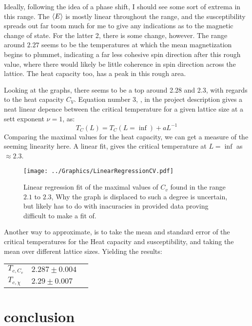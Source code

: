 \documentclass[10pt, twocolumn]{revtex4-1}
\begin{document}
Ideally, following the idea of a phase shift, I should see some sort of extrema in this range. The $\ev{E}$ is mostly linear throughout the range,
and the susceptibility spreads out far toom much for me to give any indications as to the magnetic change of state. For the latter 2, there is some change,
however. The range around $2.27$ seems to be the temperatures at which the mean magnetization begins to plummet, indicating a far less cohesive spin direction
after this rough value, where there would likely be little coherence in spin direction across the lattice. The heat capacity too, has a peak in this rough
area.

Looking at the graphs, there seems to be a top around 2.28 and 2.3, with regards to the heat capacity $C_V$. Equation number 3, \cite{Project4}, in the
project description gives a neat linear depence between the critical temperature for a given lattice size at a sett exponent $\nu = 1$, as:
\[ T_C( L ) = T_C ( L = \inf ) + aL^{-1} \]
Comparing the maximal values for the heat capacity, we can get a measure of the seeming linearity here. A linear fit, gives the critical temperature
at $L = \inf$ as $\approx 2.3$.
\begin{figure}[hbtp]
    \texttt{[image: ../Graphics/LinearRegressionCV.pdf]}
    \caption{Linear regression fit of the maximal values of $C_v$ found in the range $2.1$ to $2.3$, Why the graph is displaced to such a degree is
    uncertain, but likely has to do with inacuracies in provided data proving difficult to make a fit of.}
\label{fig:expectml20}
\end{figure}

Another way to approximate, is to take the mean and standard error of the critical temperatures for the Heat capacity and susceptibility, and taking the mean
over different lattice sizes. Yielding the results:
\begin{table}[h]
    \begin{tabular}{ |l|l|l| }
    \hline
        $T_{c,C_v}$ & $2.287 \pm 0.004$ \\
        $T_{c,\chi}$ & $2.29 \pm  0.007$ \\
    \end{tabular}
\end{table}



\section{conclusion}
\end{document}
